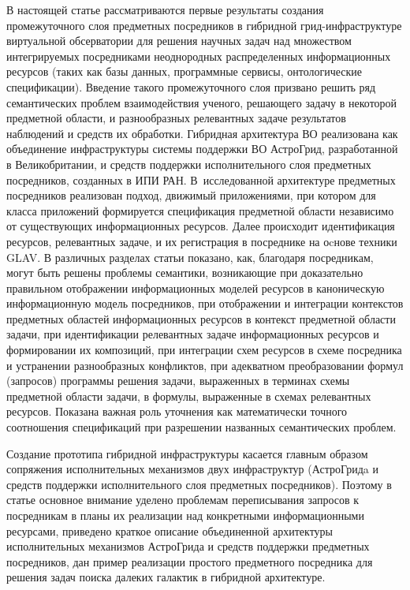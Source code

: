\begin{multicols}{2}
     В настоящей статье рассматриваются первые результаты создания промежуточного
слоя предметных посредников в гибридной грид-инфра\-струк\-ту\-ре виртуальной
обсерватории для решения научных задач над множеством интегрируемых посредниками
неоднородных распределенных информационных ресурсов (таких как базы данных,
программные сервисы, онтологические спецификации). Введение такого промежуточного
слоя призвано решить ряд семантических проблем взаимодействия ученого, решающего
задачу в некоторой предметной об\-ласти, и разнообразных релевантных задаче результатов
наблюдений и средств их обработки. Гибридная архитектура ВО реализована как
объединение инфраструктуры системы поддержки ВО АстроГрид, разработанной в
Великобритании, и средств поддержки исполнительного слоя предметных посредников,
созданных в ИПИ РАН. В~исследованной архитектуре предметных посредников
реализован подход, движимый приложениями, при котором для класса приложений
формируется спецификация предметной области независимо от существующих
информационных ресурсов. Далее происходит идентификация ресурсов, релевантных
задаче, и их регистрация в посреднике на оcнове техники GLAV. В различных разделах
статьи показано, как, благодаря посредникам, могут быть решены проблемы семантики,
возникающие при доказательно правильном отображении информационных моделей
ресурсов в каноническую информационную модель посредников, при отображении и
интеграции контекстов предметных областей информационных ресурсов в контекст
предметной области задачи, при идентификации релевантных задаче информационных
ресурсов и формировании их композиций, при интеграции схем ресурсов в схеме
посредника и устранении разнообразных конфликтов, при адекватном преобразовании
формул (запросов) программы решения задачи, выраженных в терминах схемы
предметной области задачи, в формулы, выраженные в схемах релевантных ресурсов.
Показана важная роль уточнения как математически точного соотношения спецификаций
при разрешении названных семантических проблем.

     Создание прототипа гибридной инфраструктуры касается главным образом
сопряжения исполнительных механизмов двух инфраструктур (АстроГридa и средств
поддержки исполнительного слоя предметных посредников). Поэтому в статье основное
внимание уделено проблемам переписывания запросов к посредникам в планы их
реализации над конкретными информационными ресурсами, приведено краткое описание
объединенной архитектуры исполнительных механизмов АстроГрида и средств
поддержки предметных посредников, дан пример реализации простого предметного
посредника для решения задач поиска далеких галактик в гибридной архитектуре.


\end{multicols}

